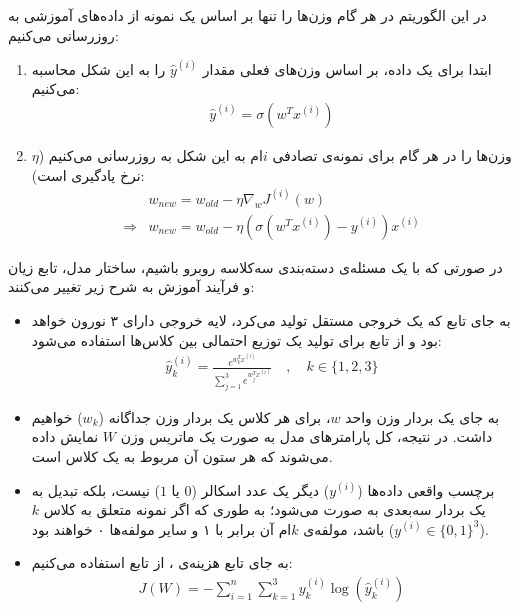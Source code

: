 \begin{ابجد}
\item در این الگوریتم در هر گام وزن‌ها را تنها بر اساس یک نمونه از داده‌های آموزشی به روزرسانی می‌کنیم:
\begin{enumerate}
    \item ابتدا برای یک داده، بر اساس وزن‌های فعلی مقدار $\hat{y}^{(i)}$ را به این شکل محاسبه می‌کنیم:
          \begin{align*}
              \hat{y}^{(i)} = \sigma ( w^Tx^{(i)})
          \end{align*}
    \item وزن‌ها را در هر گام برای نمونه‌ی تصادفی $i$ام به این شکل به روزرسانی می‌کنیم ($\eta$ نرخ یادگیری است):
          \begin{align*}
                          & w_{new} = w_{old} - \eta \nabla_w J^{(i)}(w)                      \\
              \Rightarrow & w_{new} = w_{old} - \eta (\sigma(w^Tx^{(i)}) - {y}^{(i)}) x^{(i)}
          \end{align*}
\end{enumerate}

\item در صورتی که با یک مسئله‌ی دسته‌بندی سه‌کلاسه روبرو باشیم، ساختار مدل، تابع زیان و فرآیند آموزش به شرح زیر تغییر می‌کنند:
\begin{itemize}
    \item به جای تابع  که یک خروجی مستقل تولید می‌کرد، لایه خروجی دارای ۳ نورون خواهد بود و از تابع  برای تولید یک توزیع احتمالی بین کلاس‌ها استفاده می‌شود:
          \begin{align*}
              \hat{y}_k^{(i)} = \frac{e^{w_k^Tx^{(i)}}}{\sum_{j = 1}^{3}e^{w_j^Tx^{(i)}}} \quad , \quad k \in \{1, 2, 3\}
          \end{align*}

    \item به جای یک بردار وزن واحد $w$، برای هر کلاس یک بردار وزن جداگانه ($w_k$) خواهیم داشت. در نتیجه، کل پارامترهای مدل به صورت یک ماتریس وزن $W$ نمایش داده می‌شوند که هر ستون آن مربوط به یک کلاس است.

    \item برچسب واقعی داده‌ها ($y^{(i)}$) دیگر یک عدد اسکالر ($0$ یا $1$) نیست، بلکه تبدیل به یک بردار سه‌بعدی به صورت  می‌شود؛ به طوری که اگر نمونه متعلق به کلاس $k$ باشد، مولفه‌ی $k$ام آن برابر با ۱ و سایر مولفه‌ها ۰ خواهند بود ($y^{(i)} \in \{0, 1\}^3$).

    \item به جای تابع هزینه‌ی ، از تابع  استفاده می‌کنیم:
          \begin{align*}
              J(W) = - \sum_{i = 1}^n \sum_{k = 1}^{3} y_k^{(i)} \log (\hat{y}_k^{(i)})
          \end{align*}
\end{itemize}


\end{ابجد}